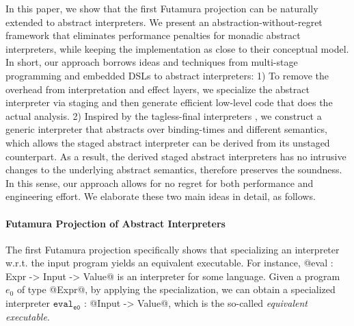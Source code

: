 In this paper, we show that the first Futamura projection can be naturally
extended to abstract interpreters. We present an abstraction-without-regret
framework that eliminates performance penalties for monadic abstract
interpreters, while keeping the implementation as close to their conceptual
model.
In short, our approach borrows ideas and techniques from multi-stage
programming and embedded DSLs to abstract interpreters:  1) To remove the
overhead from interpretation and effect layers, we specialize the abstract
interpreter via staging and then generate efficient low-level code that does
the actual analysis. 2) Inspired by the tagless-final interpreters
\cite{DBLP:journals/jfp/CaretteKS09}, we construct a generic interpreter that
abstracts over binding-times and different semantics, which allows the staged
abstract interpreter can be derived from its unstaged counterpart.
As a result, the derived staged abstract interpreters has no intrusive changes
to the underlying abstract semantics, therefore preserves the soundness.
In this sense, our approach allows for no regret for both performance and
engineering effort. We elaborate these two main ideas in detail, as follows.


\paragraph{Futamura Projection of Abstract Interpreters}

The first Futamura projection specifically shows that specializing an
interpreter w.r.t. the input program yields an equivalent executable. For
instance, @eval : Expr -> Input -> Value@ is an interpreter for some language.
Given a program $e_0$ of type @Expr@, by applying the specialization, we can
obtain a specialized interpreter $\texttt{eval}_{\texttt{e0}}$ : 
@Input -> Value@, which is the so-called \textit{equivalent executable}.


